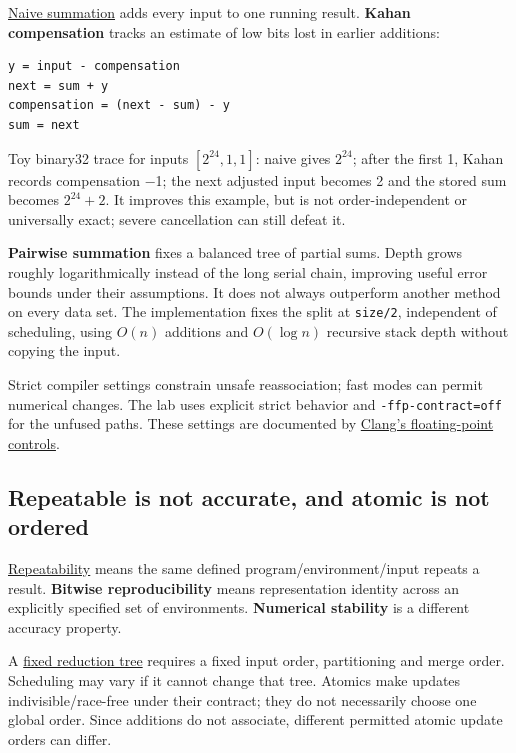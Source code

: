\hyperref[appendix-df318da57389]{Naive summation} adds every input to one running result. \textbf{Kahan compensation} tracks an estimate of low bits lost in earlier additions:

\begin{verbatim}
y = input - compensation
next = sum + y
compensation = (next - sum) - y
sum = next
\end{verbatim}

Toy binary32 trace for inputs \([2^{24},1,1]\): naive gives \(2^{24}\); after the first 1, Kahan records compensation −1; the next adjusted input becomes 2 and the stored sum becomes \(2^{24}+2\). It improves this example, but is not order-independent or universally exact; severe cancellation can still defeat it.

\textbf{Pairwise summation} fixes a balanced tree of partial sums. Depth grows roughly logarithmically instead of the long serial chain, improving useful error bounds under their assumptions. It does not always outperform another method on every data set. The implementation fixes the split at \texttt{size/2}, independent of scheduling, using \(O(n)\) additions and \(O(\log n)\) recursive stack depth without copying the input.

Strict compiler settings constrain unsafe reassociation; fast modes can permit numerical changes. The lab uses explicit strict behavior and \texttt{-ffp-contract=off} for the unfused paths. These settings are documented by \href{https://clang.llvm.org/docs/UsersManual.html\#controlling-floating-point-behavior}{Clang's floating-point controls}.

\subsection{Repeatable is not accurate, and atomic is not ordered}\label{01-foundations-i-ch001-repeatable-is-not-accurate-and-atomic-is-not-ordered}

\hyperref[appendix-5f1a2c3f97ff]{Repeatability} means the same defined program/environment/input repeats a result. \textbf{Bitwise reproducibility} means representation identity across an explicitly specified set of environments. \textbf{Numerical stability} is a different accuracy property.

A \hyperref[appendix-4c8e0238e7ee]{fixed reduction tree} requires a fixed input order, partitioning and merge order. Scheduling may vary if it cannot change that tree. Atomics make updates indivisible/race-free under their contract; they do not necessarily choose one global order. Since additions do not associate, different permitted atomic update orders can differ.

